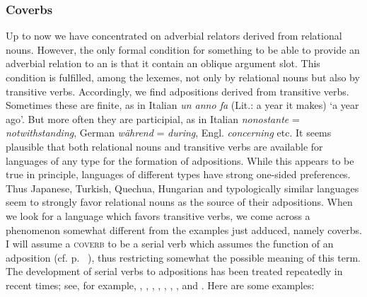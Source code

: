 \subsubsection{Coverbs}\label{sec:3.4.1.7}
Up to now we have concentrated on adverbial relators derived from relational nouns. However, the only formal condition for something to be able to provide an adverbial relation to an \np is that it contain an oblique argument slot. This condition is fulfilled, among the lexemes, not only by relational nouns but also by transitive verbs. Accordingly, we find adpositions derived from transitive verbs. Sometimes these are finite, as in Italian \textit{un anno fa} (Lit.: a year it makes) ‘a year ago’. But more often they are participial, as in Italian \textit{nonostante} = \textit{notwithstanding}, German \textit{während} = \textit{during}, Engl. \textit{concerning} etc. It seems plausible that both relational nouns and transitive verbs are available for languages of any type for the formation of adpositions. While this appears to be true in principle, languages of different types have strong one-sided preferences. Thus Japanese, Turkish, Quechua, Hungarian and typologically similar languages seem to strongly favor relational nouns as the source of their adpositions. When we look for a language which favors transitive verbs, we come across a phenomenon somewhat different from the examples just adduced, namely coverbs. I will assume a \textsc{coverb} to be a serial verb which assumes the function of an adposition (cf. p.~\pageref{page37}\chk%
), thus restricting somewhat the possible meaning of this term. The development of serial verbs to adpositions has been treated repeatedly in recent times; see, for example, \citet{LiEtAL1974}, \citet{Hagège1975}, \citet[esp. p.~93ff]{Givón1975}, \citet{Hyman1975}, \citet[33--40]{Kahr1975}, \citet[113--117]{Sasse1977a}, \citet{Huang1978}, \citet{Clark1979} and \citet[213--228]{Lightfoot1979}. Here are some examples:


